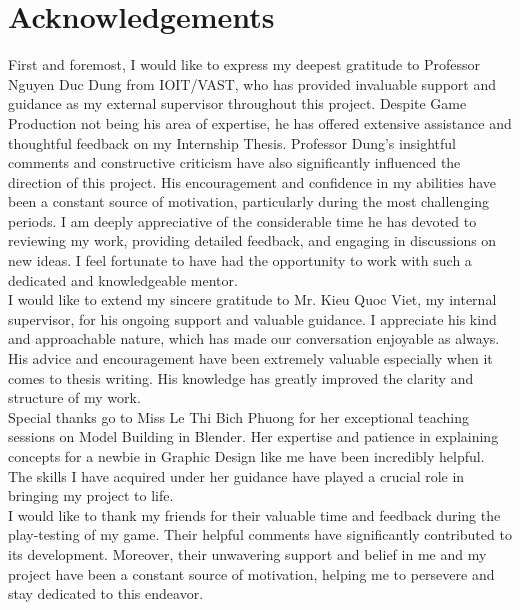 \documentclass[12pt]{article}
\begin{document}
\tableofcontents
\clearpage

\section*{Acknowledgements}
\hspace*{1.5em}First and foremost, I would like to express my deepest gratitude to Professor Nguyen Duc Dung from IOIT/VAST, who has provided invaluable support and guidance as my external supervisor throughout this project. 
Despite Game Production not being his area of expertise, he has offered extensive assistance and thoughtful feedback on my Internship Thesis. Professor Dung's insightful comments and constructive criticism have also significantly influenced the direction of this project. His encouragement and confidence in my abilities have been a constant source of motivation, particularly during the most challenging periods. I am deeply appreciative of the considerable time he has devoted to reviewing my work, providing detailed feedback, and engaging in discussions on new ideas. I feel fortunate to have had the opportunity to work with such a dedicated and knowledgeable mentor.\\

I would like to extend my sincere gratitude to Mr. Kieu Quoc Viet, my internal supervisor, for his ongoing support and valuable guidance. I appreciate his kind and approachable nature, which has made our conversation enjoyable as always. His advice and encouragement have been extremely valuable especially when it comes to thesis writing. His knowledge has greatly improved the clarity and structure of my work.\\

Special thanks go to Miss Le Thi Bich Phuong for her exceptional teaching sessions on Model Building in Blender. Her expertise and patience in explaining concepts for a newbie in Graphic Design like me have been incredibly helpful. The skills I have acquired under her guidance have played a crucial role in bringing my project to life.\\

I would like to thank my friends for their valuable time and feedback during the play-testing of my game. Their helpful comments have significantly contributed to its development. Moreover, their unwavering support and belief in me and my project have been a constant source of motivation, helping me to persevere and stay dedicated to this endeavor.\\
\end{document}

